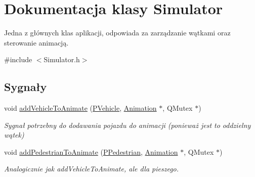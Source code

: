 \hypertarget{class_simulator}{\section{Dokumentacja klasy Simulator}
\label{class_simulator}
}


Jedna z głównych klas aplikacji, odpowiada za zarządzanie wątkami oraz sterowanie animacją.  




{\ttfamily \#include $<$Simulator.\-h$>$}

\subsection*{Sygnały}
\begin{DoxyCompactItemize}
\item 
void \hyperlink{class_simulator_a4c5b5d48f4f40984cdd5e540ade4d776}{add\-Vehicle\-To\-Animate} (\hyperlink{_types_8h_a564207d327881e8bcfa0843e1a874756}{P\-Vehicle}, \hyperlink{class_animation}{Animation} $\ast$, Q\-Mutex $\ast$)
\begin{DoxyCompactList}\small\item\em Sygnał potrzebny do dodawania pojazdu do animacji (ponieważ jest to oddzielny wątek) \end{DoxyCompactList}\item 
void \hyperlink{class_simulator_a2553d83940167fe5ecc36fb19e382126}{add\-Pedestrian\-To\-Animate} (\hyperlink{_types_8h_a6ca5cb67bb3df872d4650820dbc647b8}{P\-Pedestrian}, \hyperlink{class_animation}{Animation} $\ast$, Q\-Mutex $\ast$)
\begin{DoxyCompactList}\small\item\em Analogicznie jak add\-Vehicle\-To\-Animate, ale dla pieszego. \end{DoxyCompactList}\end{DoxyCompactItemize}
